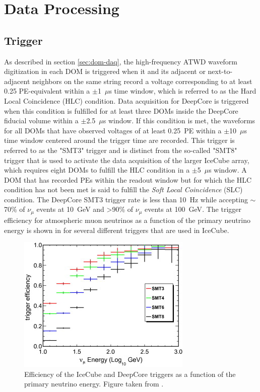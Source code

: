 \section{Data Processing}
\label{sec:data-processing}
\subsection{Trigger}
As described in section \ref{sec:dom-daq}, the high-frequency ATWD waveform digitization in each DOM is triggered when it and its adjacent or next-to-adjacent neighbors on the same string record a voltage corresponding to at least 0.25 PE-equivalent within a $\pm$1~$\mu$s time window, which is referred to as the Hard Local Coincidence (HLC) condition.
Data acquisition for DeepCore is triggered when this condition is fulfilled for at least three DOMs inside the DeepCore fiducial volume within a $\pm$2.5~$\mu$s window.
If this condition is met, the waveforms for all DOMs that have observed voltages of at least 0.25~PE within a $\pm$10~$\mu$s time window centered around the trigger time are recorded.
This trigger is referred to as the "SMT3" trigger and is distinct from the so-called "SMT8" trigger that is used to activate the data acquisition of the larger IceCube array, which requires eight DOMs to fulfill the HLC condition in a $\pm$5~$\mu$s window.
A DOM that has recorded PEs within the readout window but for which the HLC condition has not been met is said to fulfill the \emph{Soft Local Coincidence} (SLC) condition.
The DeepCore SMT3 trigger rate is less than 10~Hz while accepting $\sim$70\% of $\nu_\mu$ events at 10~GeV and >90\% of $\nu_\mu$ events at 100~GeV\cite{DeepCore}.
The trigger efficiency for atmospheric muon neutrinos as a function of the primary neutrino energy is shown in  for several different triggers that are used in IceCube.
\begin{figure}
    \centering
    \includegraphics[width=0.7\linewidth]{figures/icecube/selection/trigger/trigger_efficiency.jpg}
    \caption{Efficiency of the IceCube and DeepCore triggers as a function of the primary neutrino energy. Figure taken from \cite{DeepCore}.\label{fig:trigger-efficiency}}
\end{figure}

